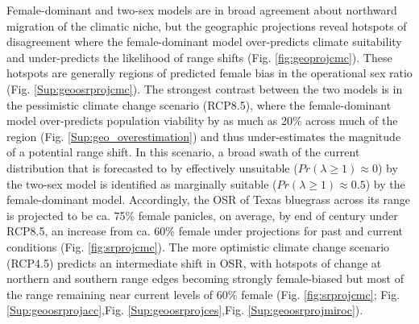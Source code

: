 \documentclass[12pt]{article}\usepackage[]{graphicx}\usepackage[dvipsnames]{xcolor}
\begin{document}
Female-dominant and two-sex models are in broad agreement about northward migration of the climatic niche, but the geographic projections reveal hotspots of disagreement where the female-dominant model over-predicts climate suitability and under-predicts the likelihood of range shifts (Fig. \ref{fig:geoprojcmc}). 
These hotspots are generally regions of predicted female bias in the operational sex ratio (Fig. \ref{Sup:geoosrprojcmc}). 
The strongest contrast between the two models is in the pessimistic climate change scenario (RCP8.5), where the female-dominant model over-predicts population viability by as much as 20\% across much of the region (Fig. \ref{Sup:geo_overestimation}) and thus under-estimates the magnitude of a potential range shift. 
In this scenario, a broad swath of the current distribution that is forecasted to by effectively unsuitable ($Pr(\lambda \ge 1) \approx 0$) by the two-sex model is identified as marginally suitable ($Pr(\lambda \ge 1) \approx 0.5$) by the female-dominant model. 
Accordingly, the OSR of Texas bluegrass across its range is projected to be ca. 75\% female panicles, on average, by end of century under RCP8.5, an increase from ca. 60\% female under projections for past and current conditions (Fig. \ref{fig:srprojcmc}). 
The more optimistic climate change scenario (RCP4.5) predicts an intermediate shift in OSR, with hotspots of change at northern and southern range edges becoming strongly female-biased but most of the range remaining near current levels of 60\% female (Fig. \ref{fig:srprojcmc}; Fig. \ref{Sup:geoosrprojacc},Fig. \ref{Sup:geoosrprojces},Fig. \ref{Sup:geoosrprojmiroc}). 
\end{document}

